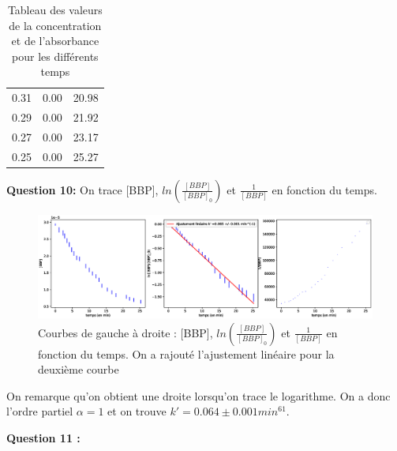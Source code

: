 \documentclass[12pt]{article}
\begin{document}
\begin{table}[h!]
\begin{center}
\begin{tabular}{|c|c|c|}
                          0.31 &                   0.00 &                  20.98 \\
                          0.29 &                   0.00 &                  21.92 \\
                          0.27 &                   0.00 &                  23.17 \\
                          0.25 &                   0.00 &                  25.27 \\
        \hline
        \end{tabular}
        \caption{Tableau des valeurs de la concentration et de l'absorbance pour les différents temps}
        \label{table1}
\end{center}
\end{table}
\textbf{Question 10:}
On trace [BBP], $ln \left(\frac{[BBP]}{[BBP]_0}\right)$ et $\frac{1}{[BBP]}$ en fonction du temps.

\begin{figure}[h!]
    \begin{center}
        \includegraphics[width=1\linewidth]{3CourbesCinétiques.eps}
        \caption{Courbes de gauche à droite : [BBP], $ln \left(\frac{[BBP]}{[BBP]_0}\right)$ et $\frac{1}{[BBP]}$ en fonction du temps. On a rajouté l'ajustement linéaire pour la deuxième courbe}
        \label{img:3courbes}
    \end{center}
\end{figure}

On remarque qu'on obtient une droite lorsqu'on trace le logarithme.
On a donc l'ordre partiel $\alpha =1$ et on trouve $k'=0.064 \pm 0.001 min^{61}$.

\textbf{Question 11 :}
\end{document}
